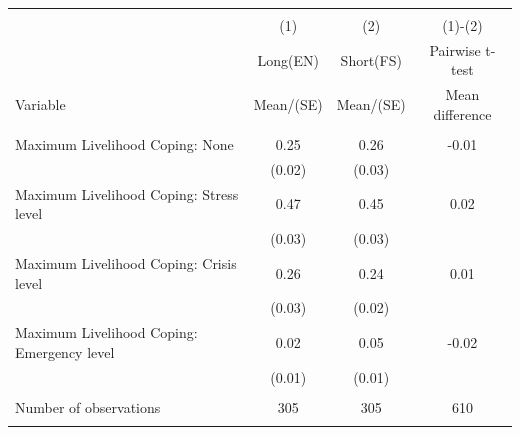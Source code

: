 
\begin{tabular}{@{\extracolsep{5pt}}lccc}
\\[-1.8ex]\hline \hline \\[-1.8ex]
 & \multicolumn{1}{c}{(1)}  & \multicolumn{1}{c}{(2)}  & \multicolumn{1}{c}{(1)-(2)} \\
 & \multicolumn{1}{c}{Long(EN)}  & \multicolumn{1}{c}{Short(FS)}  & \multicolumn{1}{c}{Pairwise t-test}  \\
Variable & Mean/(SE) & Mean/(SE) & Mean difference \\ \hline \\[-1.8ex] 
Maximum Livelihood Coping: None   & 0.25    & 0.26    & -0.01   \\
 & (0.02)  & (0.03)  &  \\ [1ex]
Maximum Livelihood Coping: Stress level   & 0.47    & 0.45    & 0.02   \\
 & (0.03)  & (0.03)  &  \\ [1ex]
Maximum Livelihood Coping: Crisis level   & 0.26    & 0.24    & 0.01   \\
 & (0.03)  & (0.02)  &  \\ [1ex]
Maximum Livelihood Coping: Emergency level   & 0.02    & 0.05    & -0.02   \\
 & (0.01)  & (0.01)  &  \\ [1ex]
\hline \\[-1.8ex]
Number of observations  & 305   & 305  & 610  \\
\hline \hline \\[-1.8ex]

\end{tabular}
